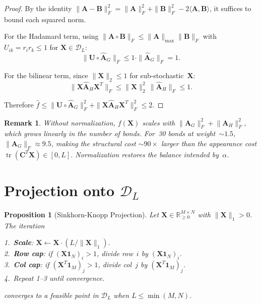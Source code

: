 \documentclass[conference]{IEEEtran}
\newtheorem{proposition}{Proposition}
\newtheorem{remark}{Remark}
\begin{document}
\begin{proof}
By the identity
$\|\mathbf{A}\!-\!\mathbf{B}\|_F^2
= \|\mathbf{A}\|_F^2 + \|\mathbf{B}\|_F^2
- 2\langle\mathbf{A},\mathbf{B}\rangle$,
it suffices to bound each squared norm.

For the Hadamard term, using
$\|\mathbf{A}\!\circ\!\mathbf{B}\|_F
\leq \|\mathbf{A}\|_{\max}\|\mathbf{B}\|_F$
with $U_{ik} = r_i r_k \leq 1$ for
$\mathbf{X}\!\in\!\mathcal{D}_L$:
\begin{equation}
\bigl\|\mathbf{U}\circ\hat{\mathbf{A}}_G\bigr\|_F
  \leq 1 \cdot \|\hat{\mathbf{A}}_G\|_F = 1.
\label{eq:bound1}
\end{equation}

For the bilinear term, since $\|\mathbf{X}\|_2 \leq 1$
for sub-stochastic~$\mathbf{X}$:
\begin{equation}
\bigl\|\mathbf{X}\hat{\mathbf{A}}_H\mathbf{X}^{T}\bigr\|_F
  \leq \|\mathbf{X}\|_2^2\,\|\hat{\mathbf{A}}_H\|_F
  \leq 1.
\label{eq:bound2}
\end{equation}

Therefore
$\hat{f} \leq \|\mathbf{U}\!\circ\!\hat{\mathbf{A}}_G\|_F^2
  + \|\mathbf{X}\hat{\mathbf{A}}_H\mathbf{X}^{T}\|_F^2
  \leq 2$.
\end{proof}

\begin{remark}
Without normalization, $f(\mathbf{X})$ scales with
$\|\mathbf{A}_G\|_F^2\!+\!\|\mathbf{A}_H\|_F^2$,
which grows linearly in the number of bonds.
For~30 bonds at weight~${\sim}1.5$,
$\|\mathbf{A}_G\|_F \!\approx\! 9.5$,
making the structural cost ${\sim}90\!\times$ larger
than the appearance cost
$\operatorname{tr}(\mathbf{C}^{T}\!\mathbf{X}) \!\in\! [0,L]$.
Normalization restores the balance intended by~$\alpha$.
\end{remark}


\section{Projection onto $\mathcal{D}_L$}
\label{sec:projection}

\begin{proposition}[Sinkhorn-Knopp Projection]
\label{prop:sinkhorn}
Let $\mathbf{X}\!\in\!\mathbb{R}_{\geq 0}^{M \times N}$ with
$\|\mathbf{X}\|_1 > 0$. The iteration

\smallskip\noindent
\textup{1.}~\textbf{Scale}: $\mathbf{X} \leftarrow \mathbf{X}\cdot(L/\|\mathbf{X}\|_1)$.\\
\textup{2.}~\textbf{Row cap}: if $(\mathbf{X}\mathbf{1}_N)_i > 1$,
  divide row~$i$ by $(\mathbf{X}\mathbf{1}_N)_i$.\\
\textup{3.}~\textbf{Col cap}: if $(\mathbf{X}^{T}\!\mathbf{1}_M)_j > 1$,
  divide col~$j$ by $(\mathbf{X}^{T}\!\mathbf{1}_M)_j$.\\
\textup{4.}~Repeat \textup{1--3} until convergence.

\smallskip\noindent
converges to a feasible point in $\mathcal{D}_L$
when $L \leq \min(M,N)$.
\end{proposition}
\end{document}
